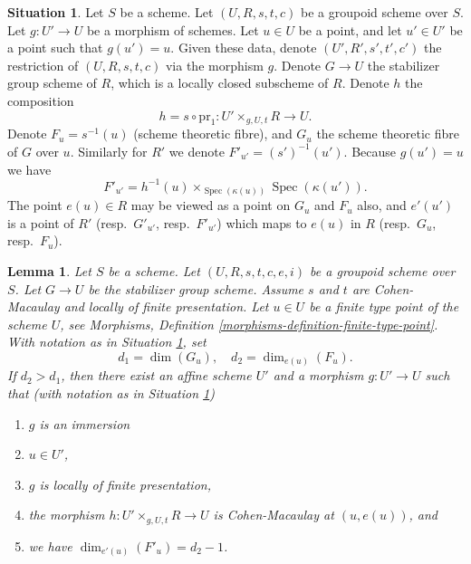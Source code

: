 \documentclass{stacks-project}
\theoremstyle{plain}
\newtheorem{lemma}[subsection]{Lemma}
\theoremstyle{definition}
\newtheorem{situation}[subsection]{Situation}
\theoremstyle{remark}
\numberwithin{equation}{subsection}
\def\Spec{\mathop{\mathrm{Spec}}}
\begin{document}
\begin{situation}
\label{situation-slice}
Let $S$ be a scheme.
Let $(U, R, s, t, c)$ be a groupoid scheme over $S$.
Let $g : U' \to U$ be a morphism of schemes.
Let $u \in U$ be a point, and let $u' \in U'$ be a point such that
$g(u') = u$. Given these data, denote $(U', R', s', t', c')$
the restriction of $(U, R, s, t, c)$ via the morphism $g$.
Denote $G \to U$ the stabilizer group scheme of $R$, which
is a locally closed subscheme of $R$.
Denote $h$ the composition
$$
h = s \circ \text{pr}_1 : U' \times_{g, U, t} R \longrightarrow U.
$$
Denote $F_u = s^{-1}(u)$ (scheme theoretic fibre), and $G_u$ the
scheme theoretic fibre of $G$ over $u$.
Similarly for $R'$ we denote $F'_{u'} = (s')^{-1}(u')$.
Because $g(u') = u$ we have
$$
F'_{u'} = h^{-1}(u) \times_{\Spec(\kappa(u))} \Spec(\kappa(u')).
$$
The point $e(u) \in R$ may be viewed as a point on $G_u$ and $F_u$ also, and
$e'(u')$ is a point of $R'$ (resp.\ $G'_{u'}$, resp.\ $F'_{u'}$) which maps
to $e(u)$ in $R$ (resp.\ $G_u$, resp.\ $F_u$).
\end{situation}

\begin{lemma}
\label{lemma-slice}
Let $S$ be a scheme.
Let $(U, R, s, t, c, e, i)$ be a groupoid scheme over $S$.
Let $G \to U$ be the stabilizer group scheme.
Assume $s$ and $t$ are Cohen-Macaulay and locally of finite presentation.
Let $u \in U$ be a finite type point of the scheme $U$, see
Morphisms, Definition \ref{morphisms-definition-finite-type-point}.
With notation as in
Situation \ref{situation-slice},
set
$$
d_1 = \dim(G_u), \quad
d_2 = \dim_{e(u)}(F_u).
$$
If $d_2 > d_1$, then there exist an affine scheme $U'$
and a morphism $g : U' \to U$ such that (with notation as in
Situation \ref{situation-slice})
\begin{enumerate}
\item $g$ is an immersion
\item $u \in U'$,
\item $g$ is locally of finite presentation,
\item the morphism $h : U' \times_{g, U, t} R \longrightarrow U$
is Cohen-Macaulay at $(u, e(u))$, and
\item we have $\dim_{e'(u)}(F'_u) = d_2 - 1$.
\end{enumerate}
\end{lemma}
\end{document}
